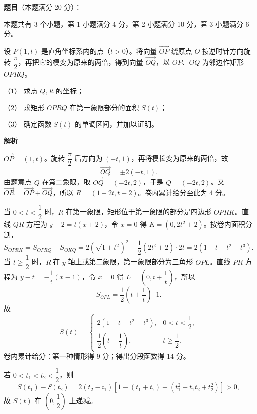 \begin{answer}

\textbf{题目}（本题满分 20 分）：

本题共有 3 个小题，第 1 小题满分 4 分，第 2 小题满分 10 分，第 3 小题满分 6 分。

设 $P(1,t)$ 是直角坐标系内的点（$t>0$）。将向量 $\overrightarrow{OP}$ 绕原点 $O$ 按逆时针方向旋转 $\dfrac\pi2$，再把它的模变为原来的两倍，得到向量 $\overrightarrow{OQ}$，以 $OP$、$OQ$ 为邻边作矩形 $OPRQ$。

（1） 求点 $Q,R$ 的坐标；

（2） 求矩形 $OPRQ$ 在第一象限部分的面积 $S(t)$；

（3） 确定函数 $S(t)$ 的单调区间，并加以证明。

\textbf{解析}


$\overrightarrow{OP}=(1,t)$。旋转 $\dfrac\pi2$ 后方向为 $(-t,1)$，再将模长变为原来的两倍，故
\nopagebreak[4]
\[
\overrightarrow{OQ}=\pm2(-t,1).
\]
由题意点 $Q$ 在第二象限，取 $\overrightarrow{OQ}=(-2t,2)$，于是 $Q=(-2t,2)$。又 $\overrightarrow{OR}=\overrightarrow{OP}+\overrightarrow{OQ}$，所以 $R=(1-2t,t+2)$。卷内累计给分至此为 4 分。


当 $0<t<\dfrac12$ 时，$R$ 在第一象限，矩形位于第一象限的部分是四边形 $OPRK$。直线 $QR$ 方程为 $y-2=t(x+2)$，令 $x=0$ 得 $K=(0,2t^2+2)$。按卷内面积分割，
\nopagebreak[4]
\[
S_{OPRK}=S_{OPRQ}-S_{OKQ}
=2(\sqrt{1+t^2})^2-\frac12(2t^2+2)\cdot2t
=2(1-t+t^2-t^3).
\]
当 $t\ge\dfrac12$ 时，$R$ 在 $y$ 轴上或第二象限，第一象限部分为三角形 $OPL$。直线 $PR$ 方程为 $y-t=-\dfrac1t(x-1)$，令 $x=0$ 得 $L=(0,t+\dfrac1t)$，所以
\nopagebreak[4]
\[
S_{OPL}=\frac12\left(t+\frac1t\right)\cdot1.
\]
故
\nopagebreak[4]
\[
S(t)=\begin{cases}
2(1-t+t^2-t^3),&0<t<\dfrac12,\\[2pt]
\dfrac12\left(t+\dfrac1t\right),&t\ge\dfrac12.
\end{cases}
\]
卷内累计给分：第一种情形得 9 分；得出分段函数得 14 分。

\Needspace{0.4\textheight}


若 $0<t_1<t_2<\dfrac12$，则
\nopagebreak[4]
\[
S(t_1)-S(t_2)=2(t_2-t_1)\left[1-(t_1+t_2)+(t_1^2+t_1t_2+t_2^2)\right]>0,
\]
故 $S(t)$ 在 $(0,\dfrac12)$ 上递减。


\end{answer}
